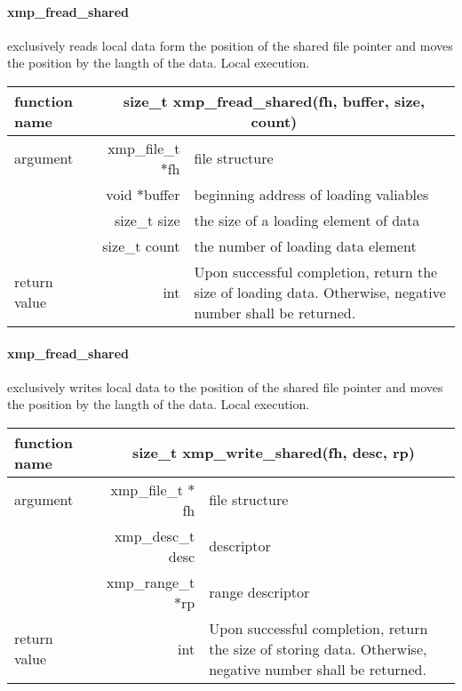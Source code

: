    \paragraph{ xmp\_fread\_shared} exclusively reads local data form the position of the shared file
   pointer and moves the position by the langth of the data.
   Local execution.

   \begin{table}[h]
    \begin{center}
     \begin{tabular}{|l|r|p{80mm}|}
      \hline
      {\bf function name}  & \multicolumn{2}{c|}{\bf size\_t
      xmp\_fread\_shared(fh, buffer, size, count)}  \\ \hline \hline
      argument & xmp\_file\_t $*$fh & file structure \\ \cline{2-3}
      & void $*$buffer & beginning address of loading valiables \\ \cline{2-3}
      & size\_t size & the size of a loading element of data \\ \cline{2-3}
      & size\_t count & the number of loading data element \\ \hline
      return value & int & Upon successful completion, return the size
	      of loading data. Otherwise, negative number shall be
	      returned. \\ \hline
      \end{tabular}
     \end{center}
    \label{tb:aaa}
   \end{table}

   \paragraph{ xmp\_fread\_shared} exclusively writes local data to the
   position of the shared file pointer and moves the position by the langth of the data.
   Local execution.

   \begin{table}[h]
    \begin{center}
     \begin{tabular}{|l|r|p{80mm}|}
      \hline
      {\bf function name}  & \multicolumn{2}{c|}{\bf size\_t
      xmp\_write\_shared(fh, desc, rp)} \\ \hline \hline
      argument & xmp\_file\_t $*$fh & file structure \\ \cline{2-3}
      & xmp\_desc\_t desc & descriptor \\ \cline{2-3}
      & xmp\_range\_t $*$rp & range descriptor \\ \hline
      return value & int & Upon successful completion, return the size
	      of storing data. Otherwise, negative number shall be
	      returned. \\ \hline
      \end{tabular}
     \end{center}
    \label{tb:aaa}
   \end{table}


